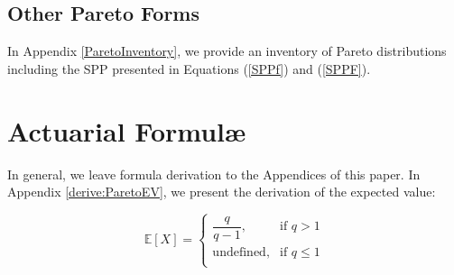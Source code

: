 

\subsection{Other Pareto Forms}
In Appendix \ref{ParetoInventory}, we provide an inventory of Pareto distributions including the SPP presented in Equations (\ref{SPPf}) and (\ref{SPPF}). 

\section{Actuarial Formul\ae}
In general, we leave formula derivation to the Appendices of this paper. In Appendix \ref{derive:ParetoEV}, we present the derivation of the expected value:

\begin{equation}
\mathbb{E}[X]  = 
\begin{cases}
\dfrac{q}{q-1},& \text{if } q > 1\\
\text{undefined},& \text{if } q \leq 1\\         
\end{cases}
\end{equation}
